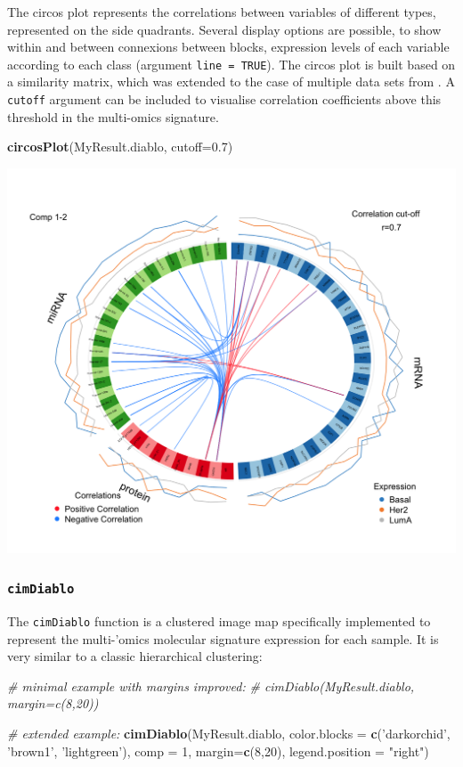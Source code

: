\documentclass[]{book}
\newenvironment{Shaded}{\begin{snugshade}}{\end{snugshade}}
\newcommand{\KeywordTok}[1]{\textcolor[rgb]{0.13,0.29,0.53}{\textbf{#1}}}
\newcommand{\DataTypeTok}[1]{\textcolor[rgb]{0.13,0.29,0.53}{#1}}
\newcommand{\DecValTok}[1]{\textcolor[rgb]{0.00,0.00,0.81}{#1}}
\newcommand{\FloatTok}[1]{\textcolor[rgb]{0.00,0.00,0.81}{#1}}
\newcommand{\StringTok}[1]{\textcolor[rgb]{0.31,0.60,0.02}{#1}}
\newcommand{\CommentTok}[1]{\textcolor[rgb]{0.56,0.35,0.01}{\textit{#1}}}
\newcommand{\NormalTok}[1]{#1}
\theoremstyle{definition}
\theoremstyle{definition}
\theoremstyle{definition}
\theoremstyle{remark}
\begin{document}
The circos plot represents the correlations between variables of
different types, represented on the side quadrants. Several display
options are possible, to show within and between connexions between
blocks, expression levels of each variable according to each class
(argument \texttt{line\ =\ TRUE}). The circos plot is built based on a
similarity matrix, which was extended to the case of multiple data sets
from \citep{Gon12}. A \texttt{cutoff} argument can be included to
visualise correlation coefficients above this threshold in the
multi-omics signature.

\begin{Shaded}
\begin{Highlighting}[]
\KeywordTok{circosPlot}\NormalTok{(MyResult.diablo, }\DataTypeTok{cutoff=}\FloatTok{0.7}\NormalTok{)}
\end{Highlighting}
\end{Shaded}

\begin{center}\includegraphics[width=0.5\linewidth]{Figures/unnamed-chunk-7-1} \end{center}

\subsubsection{\texorpdfstring{\texttt{cimDiablo}}{cimDiablo}}\label{cimdiablo}

The \texttt{cimDiablo} function is a clustered image map specifically
implemented to represent the multi-'omics molecular signature expression
for each sample. It is very similar to a classic hierarchical
clustering:

\begin{Shaded}
\begin{Highlighting}[]
\CommentTok{# minimal example with margins improved:}
\CommentTok{# cimDiablo(MyResult.diablo, margin=c(8,20))}

\CommentTok{# extended example:}
\KeywordTok{cimDiablo}\NormalTok{(MyResult.diablo, }\DataTypeTok{color.blocks =} \KeywordTok{c}\NormalTok{(}\StringTok{'darkorchid'}\NormalTok{, }\StringTok{'brown1'}\NormalTok{, }\StringTok{'lightgreen'}\NormalTok{), }\DataTypeTok{comp =} \DecValTok{1}\NormalTok{, }\DataTypeTok{margin=}\KeywordTok{c}\NormalTok{(}\DecValTok{8}\NormalTok{,}\DecValTok{20}\NormalTok{), }\DataTypeTok{legend.position =} \StringTok{"right"}\NormalTok{)}
\end{Highlighting}
\end{Shaded}
\end{document}
